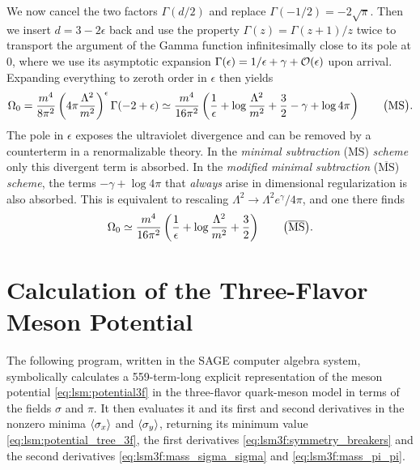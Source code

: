 We now cancel the two factors $\Gamma(d/2)$ and replace $\Gamma(-1/2) = -2\sqrt{\pi}$.
Then we insert $d = 3 - 2 \epsilon$ back and use the property $\Gamma(z) = \Gamma(z+1) / z$ twice to transport the argument of the Gamma function infinitesimally close to its pole at $0$,
where we use its asymptotic expansion $\Gamma(\epsilon) = 1/\epsilon + \gamma + \mathcal{O}(\epsilon)$ upon arrival.
Expanding everything to zeroth order in $\epsilon$ then yields
\begin{equation}
	\Omega_0 =       \frac{m^4}{8 \pi^2} \left( 4 \pi \frac{\Lambda^2}{m^2} \right)^\epsilon \Gamma(-2 + \epsilon)
	         \simeq \frac{m^4}{16 \pi^2} \left( \frac{1}{\epsilon} + \log \frac{\Lambda^2}{m^2} + \frac32 - \gamma + \log 4 \pi \right)
	         \qquad \big( \text{MS} \big).
\label{eq:diracsea:pole_expansion}
\end{equation}
The pole in $\epsilon$ exposes the ultraviolet divergence and can be removed by a counterterm in a renormalizable theory.
In the \emph{minimal subtraction} ($\text{MS}$) \emph{scheme} only this divergent term is absorbed.
In the \emph{modified minimal subtraction} ($\overline{\text{MS}}$) \emph{scheme},
the terms $-\gamma + \log 4 \pi$ that \emph{always} arise in dimensional regularization is also absorbed.
This is equivalent to rescaling $\Lambda^2 \rightarrow \Lambda^2 e^\gamma / 4 \pi$,
and one there finds
\begin{equation}
	\Omega_0 \simeq \frac{m^4}{16 \pi^2} \left( \frac{1}{\epsilon} + \log \frac{\Lambda^2}{m^2} + \frac32 \right)
	\qquad \big( \overline{\text{MS}} \big) .
\label{eq:diracsea:pole_expansion_modified}
\end{equation}


\chapter{Calculation of the Three-Flavor Meson Potential}
\label{chap:lsm3fpotential}

The following program, written in the SAGE computer algebra system,
symbolically calculates a 559-term-long explicit representation of the meson potential \eqref{eq:lsm:potential3f} in the three-flavor quark-meson model in terms of the fields $\sigma$ and $\pi$.
It then evaluates it and its first and second derivatives in the nonzero minima $\langle \sigma_x \rangle$ and $\langle \sigma_y \rangle$,
returning its minimum value \eqref{eq:lsm:potential_tree_3f}, the first derivatives \eqref{eq:lsm3f:symmetry_breakers} and the second derivatives \eqref{eq:lsm3f:mass_sigma_sigma} and \eqref{eq:lsm3f:mass_pi_pi}.

